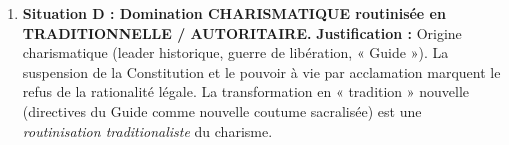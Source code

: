 \documentclass[11pt]{article}
\begin{document}
\begin{exoresolu}
\begin{enumerate}
    \textbf{Justification :} L'accès au pouvoir suit une procédure juridique codifiée (Constitution, suffrage universel, limite de mandats). L'organisation administrative repose sur la séparation des pouvoirs (Président, PM, Parlement) et la compétence technique (bureaucratie). L'obéissance va à la \emph{fonction} (Président de la République) définie par la loi, non à l'homme.
    \item \textbf{Situation D : Domination CHARISMATIQUE routinisée en TRADITIONNELLE / AUTORITAIRE.}
    \textbf{Justification :} Origine charismatique (leader historique, guerre de libération, « Guide »). La suspension de la Constitution et le pouvoir à vie par acclamation marquent le refus de la rationalité légale. La transformation en « tradition » nouvelle (directives du Guide comme nouvelle coutume sacralisée) est une \emph{routinisation traditionaliste} du charisme.
\end{enumerate}
\end{exoresolu}
\end{document}

